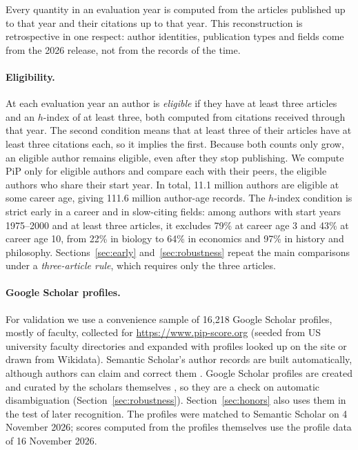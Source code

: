 \documentclass[11pt]{article}
\begin{document}
Every quantity in an evaluation year is computed from the articles published up to that year and their citations up to
that year. This reconstruction is retrospective in one respect: author identities, publication types and fields come from
the 2026 release, not from the records of the time.

\paragraph{Eligibility.} At each evaluation year an author is \emph{eligible} if they have at least three articles and
an $h$-index of at least three, both computed from citations received through that year. The second condition means that
at least three of their articles have at least three citations each, so it implies the first. Because both counts only
grow, an eligible author remains eligible, even after they stop publishing. We compute PiP only for eligible authors
and compare each with their peers, the eligible authors who share their start year. In total, 11.1 million authors are
eligible at some career age, giving 111.6 million author-age records. The $h$-index condition is strict early in a
career and in slow-citing fields: among authors with start years 1975--2000 and at least three articles, it excludes
79\% at career age 3 and 43\% at career age 10, from 22\% in biology to 64\% in economics and 97\% in history and
philosophy. Sections~\ref{sec:early} and~\ref{sec:robustness} repeat the main comparisons under a
\emph{three-article rule}, which requires only the three articles.

\paragraph{Google Scholar profiles.} For validation we use a convenience sample of 16,218 Google Scholar profiles,
mostly of faculty, collected for \url{https://www.pip-score.org} (seeded from US university faculty directories and
expanded with profiles looked up on the site or drawn from Wikidata). Semantic Scholar's author records are built
automatically, although authors can
claim and correct them \citep{kinney2023semantic}. Google Scholar profiles are created and curated by the scholars
themselves \citep{googlescholarprofiles}, so they are a check on automatic disambiguation
(Section~\ref{sec:robustness}). Section~\ref{sec:honors} also uses them in the test of later recognition. The profiles
were matched to Semantic Scholar on 4 November 2026; scores computed from the profiles themselves use the profile data
of 16 November 2026.
\end{document}
